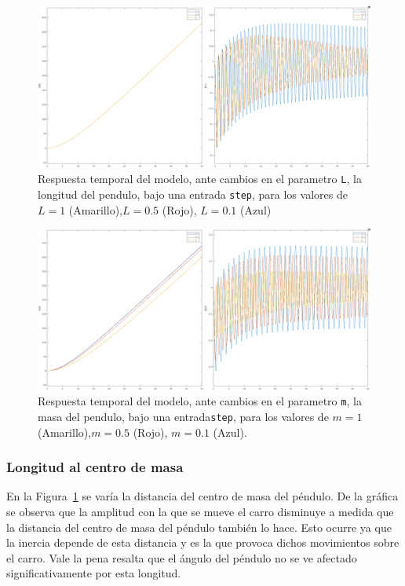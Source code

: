 \documentclass[journal]{IEEEtran}
\begin{document}
\begin{figure}[t!]
\caption{Respuesta temporal del modelo, ante cambios en el parametro \texttt{L}, la longitud del pendulo, bajo una entrada \texttt{step}, para los valores de $L=1$ (Amarillo),$L=0.5$ (Rojo), $L=0.1$ (Azul)\label{fig:var-len}}
  \centering
\includegraphics[scale=0.15]{L.png}
\end{figure}

\begin{figure}[t!]
\caption{Respuesta temporal del modelo, ante cambios en el parametro \texttt{m}, la masa del pendulo, bajo una entrada\texttt{step}, para los valores de $m=1$ (Amarillo),$m=0.5$ (Rojo), $m=0.1$ (Azul).\label{fig:var-mass}}
  \centering
	\includegraphics[scale=0.15]{m.png}
\end{figure}

\subsubsection*{Longitud al centro de masa}
En la Figura~\ref{fig:var-len} se varía la distancia del centro de masa
del péndulo. De la gráfica se observa que la amplitud con la que se
mueve el carro disminuye a medida que la distancia del centro
de masa del péndulo también lo hace. Esto ocurre ya que la inercia depende de esta
distancia y es la que provoca dichos movimientos sobre el carro.
Vale la pena resalta que el ángulo del péndulo
no se ve afectado significativamente por esta longitud.\\
\end{document}
